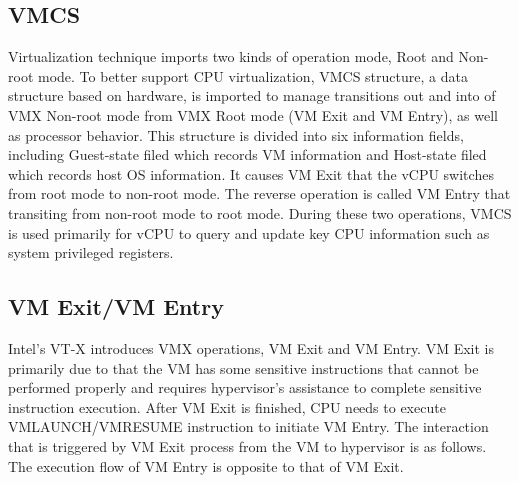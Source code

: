 \documentclass[conference]{IEEEtran}
\begin{document}
\subsection{VMCS}
Virtualization technique imports two kinds of operation mode, Root and Non-root mode. %
To better support CPU virtualization, VMCS structure, a data structure based on hardware, is imported to manage transitions out and into of VMX Non-root mode from VMX Root mode (VM Exit and VM Entry), as well as processor behavior.
This structure is divided into six information fields, including Guest-state filed which records VM information and Host-state filed which records host OS information.
It causes VM Exit that the vCPU switches from root mode to non-root mode. The reverse operation is called VM Entry that transiting from non-root mode to root mode. During these two operations, VMCS is used primarily for vCPU to query and update key CPU information such as system privileged registers.



%
\subsection{VM Exit/VM Entry}
Intel's VT-X introduces VMX operations, VM Exit and VM Entry. VM Exit is primarily due to that the VM has some sensitive instructions that cannot be performed properly and requires hypervisor's assistance to complete sensitive instruction execution. After VM Exit is finished, CPU needs to execute VMLAUNCH/VMRESUME instruction to initiate VM Entry. The interaction that is triggered by VM Exit process from the VM to hypervisor is as follows. The execution flow of VM Entry is opposite to that of VM Exit.
\end{document}
